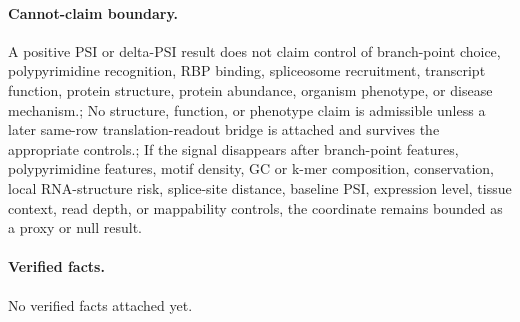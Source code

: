 \paragraph{Cannot-claim boundary.} A positive PSI or delta-PSI result does not claim control of branch-point choice, polypyrimidine recognition, RBP binding, spliceosome recruitment, transcript function, protein structure, protein abundance, organism phenotype, or disease mechanism.; No structure, function, or phenotype claim is admissible unless a later same-row translation-readout bridge is attached and survives the appropriate controls.; If the signal disappears after branch-point features, polypyrimidine features, motif density, GC or k-mer composition, conservation, local RNA-structure risk, splice-site distance, baseline PSI, expression level, tissue context, read depth, or mappability controls, the coordinate remains bounded as a proxy or null result.

\paragraph{Verified facts.}
No verified facts attached yet.
